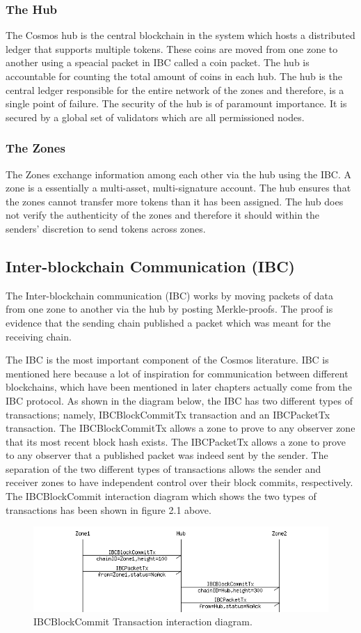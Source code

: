 \documentclass[a4paper,twoside,phd]{BYUPhys}
\begin{document}
\subsubsection{The Hub}
The Cosmos hub is the central blockchain in the system which hosts a distributed ledger that supports multiple tokens. These coins are moved from one zone to another using a speacial packet in IBC called a coin packet. The hub is accountable for counting the total amount of coins in each hub. The hub is the central ledger responsible for the entire network of the zones and therefore, is a single point of failure. The security of the hub is of paramount importance. It is secured by a global set of validators which are all permissioned nodes.
\subsubsection{The Zones}
The Zones exchange information among each other via the hub using the IBC. A zone is a essentially a multi-asset, multi-signature account. The hub ensures that the zones cannot transfer more tokens than it has been assigned. The hub does not verify the authenticity of the zones and therefore it should within the senders' discretion to send tokens across zones. 
\subsection{Inter-blockchain Communication (IBC)}
The Inter-blockchain communication (IBC) works by moving packets of data from one zone to another via the hub by posting Merkle-proofs. The proof is evidence that the sending chain published a packet which was meant for the receiving chain. 

The IBC is the most important component of the Cosmos literature. IBC is mentioned here because a lot of inspiration for communication between different blockchains, which have been mentioned in later chapters actually come from the IBC protocol. As shown in the diagram below, the IBC has two different types of transactions; namely, IBCBlockCommitTx transaction and an IBCPacketTx transaction. The IBCBlockCommitTx allows a zone to prove to any observer zone that its most recent block hash exists. The IBCPacketTx allows a zone to prove to any observer that a published packet was indeed sent by the sender. The separation of the two different types of transactions allows the sender and receiver zones to have independent control over their block commits, respectively. The IBCBlockCommit interaction diagram which shows the two types of transactions has been shown in figure 2.1 above.
\begin{figure}
  \includegraphics[width=\linewidth]{ibc_transactions.png}
  \caption{IBCBlockCommit Transaction interaction diagram.}
  \label{fig:1}
\end{figure}
\end{document}
